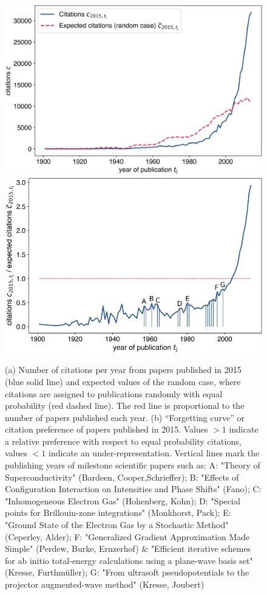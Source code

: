 \documentclass[draft,final]{vutinfth} %
\begin{document}
\begin{figure}[h!]
	\centering
	  \includegraphics[width=0.6\columnwidth]{figures_aps/1b.png}
	  \includegraphics[width=0.6\columnwidth]{figures_aps/1c.png}
		\caption{ 
		(a) Number of citations per year from papers published in 2015 (blue solid line) and expected values of the random case, where citations are assigned to publications randomly with equal probability (red dashed line). The red line is proportional to the number of papers published each year.
		(b) ``Forgetting curve'' or citation preference of papers published in 2015. Values $>1$ indicate a relative preference with respect to equal probability citations, values $<1$ indicate an under-representation.
		Vertical lines mark the publishing years of milestone scientific papers such as:
		A: "Theory of Superconductivity" (Bardeen, Cooper,Schrieffer); B: "Effects of Configuration Interaction on Intensities and Phase Shifts" (Fano); C: "Inhomogeneous Electron Gas" (Hohenberg, Kohn); D: "Special points for Brillouin-zone integrations" (Monkhorst, Pack); E: "Ground State of the Electron Gas by a Stochastic Method"
(Ceperley, Alder); F: "Generalized Gradient Approximation Made Simple" (Perdew, Burke, Ernzerhof) \& "Efficient iterative schemes for ab initio total-energy calculations using a plane-wave basis set" (Kresse, Furthmüller); G: "From ultrasoft pseudopotentials to the projector augmented-wave method" (Kresse, Joubert)}
	\label{fig:aor2}
\end{figure}
\end{document}
